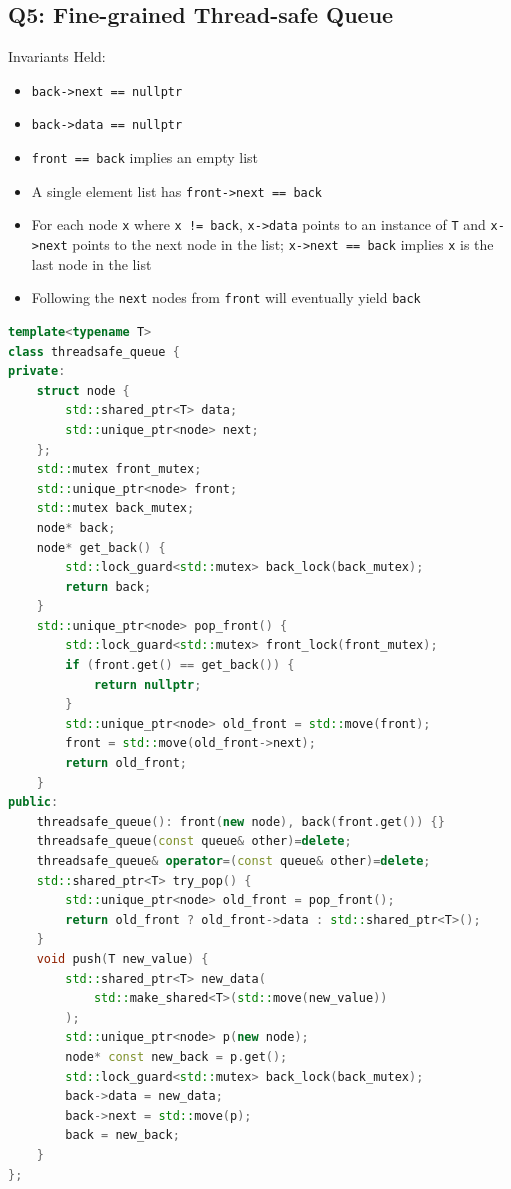 \documentclass{article}
\begin{document}
\subsection{Q5: Fine-grained Thread-safe Queue}
Invariants Held:
\begin{itemize}
    \item \verb|back->next == nullptr|
    \item \verb|back->data == nullptr|
    \item \verb|front == back| implies an empty list
    \item A single element list has \verb|front->next == back|
    \item For each node \verb|x| where \verb|x != back|, \verb|x->data| points to an instance of \verb|T| and \verb|x->next| points to the next node in the list; \verb|x->next == back| implies \verb|x| is the last node in the list
    \item Following the \verb|next| nodes from \verb|front| will eventually yield \verb|back|
\end{itemize}

\begin{lstlisting}[language=C++]
template<typename T>
class threadsafe_queue {
private:
    struct node {
        std::shared_ptr<T> data;
        std::unique_ptr<node> next;
    };
    std::mutex front_mutex;
    std::unique_ptr<node> front;
    std::mutex back_mutex;
    node* back;
    node* get_back() {
        std::lock_guard<std::mutex> back_lock(back_mutex);
        return back;
    }
    std::unique_ptr<node> pop_front() {
        std::lock_guard<std::mutex> front_lock(front_mutex);
        if (front.get() == get_back()) {
            return nullptr;
        }
        std::unique_ptr<node> old_front = std::move(front);
        front = std::move(old_front->next);
        return old_front;
    }
public:
    threadsafe_queue(): front(new node), back(front.get()) {}
    threadsafe_queue(const queue& other)=delete;
    threadsafe_queue& operator=(const queue& other)=delete;
    std::shared_ptr<T> try_pop() {
        std::unique_ptr<node> old_front = pop_front();
        return old_front ? old_front->data : std::shared_ptr<T>();
    }
    void push(T new_value) {
        std::shared_ptr<T> new_data(
            std::make_shared<T>(std::move(new_value))
        );
        std::unique_ptr<node> p(new node);
        node* const new_back = p.get();
        std::lock_guard<std::mutex> back_lock(back_mutex);
        back->data = new_data;
        back->next = std::move(p);
        back = new_back;
    }
};
\end{lstlisting}
\end{document}
